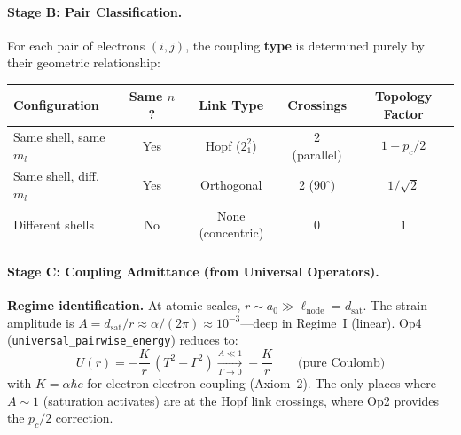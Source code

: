 \paragraph{Stage B: Pair Classification.}
For each pair of electrons $(i, j)$, the coupling \textbf{type}
is determined purely by their geometric relationship:

\begin{center}
\small
\renewcommand{\arraystretch}{1.25}
\begin{tabular}{lcccc}
\toprule
\textbf{Configuration} & \textbf{Same $n$?} & \textbf{Link Type}
& \textbf{Crossings} & \textbf{Topology Factor} \\
\midrule
Same shell, same $m_l$ & Yes & Hopf ($2_1^2$) & 2 (parallel)
& $1 - p_c/2$ \\
Same shell, diff.\ $m_l$ & Yes & Orthogonal & 2 ($90^\circ$)
& $1/\sqrt{2}$ \\
Different shells & No & None (concentric) & 0
& $1$ \\
\bottomrule
\end{tabular}
\end{center}

\paragraph{Stage C: Coupling Admittance (from Universal Operators).}

\noindent\textbf{Regime identification.}
At atomic scales, $r \sim a_0 \gg \ell_{\text{node}} = d_{\text{sat}}$.
The strain amplitude is $A = d_{\text{sat}}/r \approx \alpha/(2\pi)
\approx 10^{-3}$---deep in Regime~I (linear).
Op4 (\texttt{universal\_pairwise\_energy}) reduces to:
\begin{equation}
    U(r) = -\frac{K}{r}\,(T^2 - \Gamma^2)
    \xrightarrow[\Gamma \to 0]{A \ll 1}
    -\frac{K}{r}
    \qquad \text{(pure Coulomb)}
\end{equation}
with $K = \alpha\hbar c$ for electron-electron coupling (Axiom~2).
The only places where $A \sim 1$ (saturation activates) are at
the Hopf link crossings, where Op2 provides the $p_c/2$ correction.

